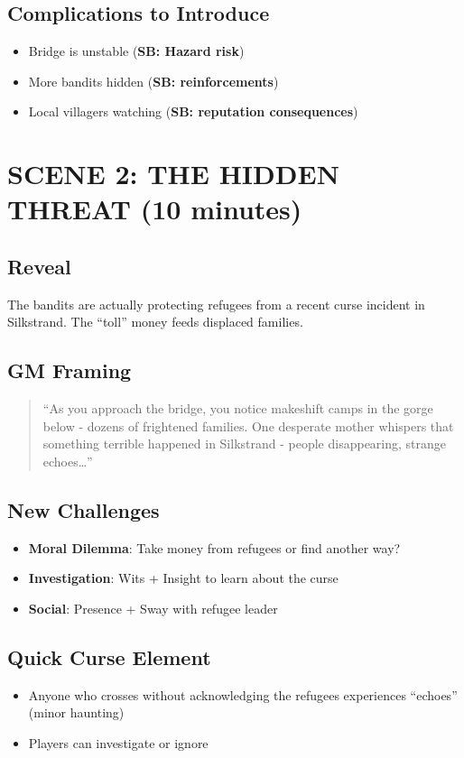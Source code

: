 \documentclass[12pt]{article}
\newcommand{\cp}[1]{\textbf{SB: #1}}
\begin{document}
\subsection*{Complications to Introduce}
\begin{itemize}
\item Bridge is unstable (\cp{Hazard risk})
\item More bandits hidden (\cp{reinforcements})
\item Local villagers watching (\cp{reputation consequences})
\end{itemize}

\section{SCENE 2: THE HIDDEN THREAT (10 minutes)}

\subsection*{Reveal}
The bandits are actually protecting refugees from a recent curse incident in Silkstrand. The ``toll'' money feeds displaced families.

\subsection*{GM Framing}
\begin{quote}
``As you approach the bridge, you notice makeshift camps in the gorge below - dozens of frightened families. One desperate mother whispers that something terrible happened in Silkstrand - people disappearing, strange echoes\dots''
\end{quote}

\subsection*{New Challenges}
\begin{itemize}
\item \textbf{Moral Dilemma}: Take money from refugees or find another way?
\item \textbf{Investigation}: Wits + Insight to learn about the curse
\item \textbf{Social}: Presence + Sway with refugee leader
\end{itemize}

\subsection*{Quick Curse Element}
\begin{itemize}
\item Anyone who crosses without acknowledging the refugees experiences ``echoes'' (minor haunting)
\item Players can investigate or ignore
\end{itemize}
\end{document}
